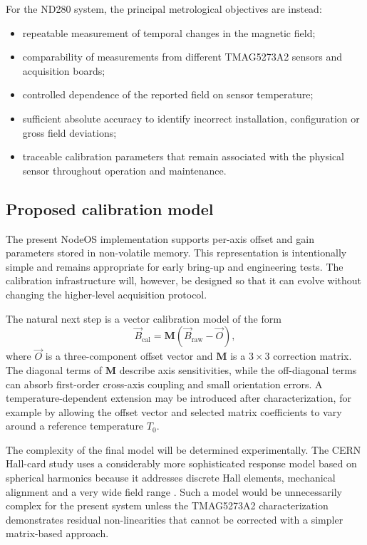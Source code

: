 For the ND280 system, the principal metrological objectives are instead:

\begin{itemize}[leftmargin=*]
\item repeatable measurement of temporal changes in the magnetic field;
\item comparability of measurements from different TMAG5273A2 sensors and acquisition boards;
\item controlled dependence of the reported field on sensor temperature;
\item sufficient absolute accuracy to identify incorrect installation, configuration or gross field deviations;
\item traceable calibration parameters that remain associated with the physical sensor throughout operation and maintenance.
\end{itemize}

\subsection{Proposed calibration model}

The present NodeOS implementation supports per-axis offset and gain parameters stored in non-volatile memory. This representation is intentionally simple and remains appropriate for early bring-up and engineering tests. The calibration infrastructure will, however, be designed so that it can evolve without changing the higher-level acquisition protocol.

The natural next step is a vector calibration model of the form
\begin{equation}
\vec{B}_{\mathrm{cal}} = \mathbf{M}\left(\vec{B}_{\mathrm{raw}}-\vec{O}\right),
\label{eq:nd280_vector_calibration}
\end{equation}
where $\vec{O}$ is a three-component offset vector and $\mathbf{M}$ is a $3\times3$ correction matrix. The diagonal terms of $\mathbf{M}$ describe axis sensitivities, while the off-diagonal terms can absorb first-order cross-axis coupling and small orientation errors. A temperature-dependent extension may be introduced after characterization, for example by allowing the offset vector and selected matrix coefficients to vary around a reference temperature $T_0$.

The complexity of the final model will be determined experimentally. The CERN Hall-card study uses a considerably more sophisticated response model based on spherical harmonics because it addresses discrete Hall elements, mechanical alignment and a very wide field range \cite{MessnerHallCalibration}. Such a model would be unnecessarily complex for the present system unless the TMAG5273A2 characterization demonstrates residual non-linearities that cannot be corrected with a simpler matrix-based approach.

